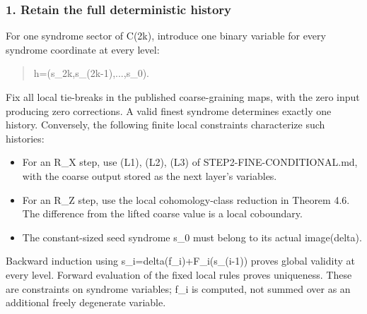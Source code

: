 \documentclass[
]{article}
\providecommand{\tightlist}{%
  \setlength{\itemsep}{0pt}\setlength{\parskip}{0pt}}
\begin{document}
\subsubsection{1. Retain the full deterministic
history}\label{retain-the-full-deterministic-history}

For one syndrome sector of C(2k), introduce one binary variable for
every syndrome coordinate at every level:

\begin{quote}\small\ttfamily\raggedright\setlength{\parskip}{0pt}
\noindent h\allowbreak{}\hspace*{0.525em}\allowbreak{}=\allowbreak{}\hspace*{0.525em}\allowbreak{}(\allowbreak{}s\allowbreak{}\_\allowbreak{}2\allowbreak{}k\allowbreak{},\allowbreak{}\hspace*{0.525em}\allowbreak{}s\allowbreak{}\_\allowbreak{}(\allowbreak{}2\allowbreak{}k\allowbreak{}-\allowbreak{}1\allowbreak{})\allowbreak{},\allowbreak{}\hspace*{0.525em}\allowbreak{}.\allowbreak{}.\allowbreak{}.\allowbreak{},\allowbreak{}\hspace*{0.525em}\allowbreak{}s\allowbreak{}\_\allowbreak{}0\allowbreak{})\allowbreak{}.\par
\end{quote}

Fix all local tie-breaks in the published coarse-graining maps, with the
zero input producing zero corrections. A valid finest syndrome
determines exactly one history. Conversely, the following finite local
constraints characterize such histories:

\begin{itemize}
\tightlist
\item
  For an R\_X step, use (L1), (L2), (L3) of STEP2-FINE-CONDITIONAL.md,
  with the coarse output stored as the next layer's variables.
\item
  For an R\_Z step, use the local cohomology-class reduction in Theorem
  4.6. The difference from the lifted coarse value is a local
  coboundary.
\item
  The constant-sized seed syndrome s\_0 must belong to its actual
  image(delta).
\end{itemize}

Backward induction using
s\allowbreak{}\_\allowbreak{}i\allowbreak{}=\allowbreak{}d\allowbreak{}e\allowbreak{}l\allowbreak{}t\allowbreak{}a\allowbreak{}(\allowbreak{}f\allowbreak{}\_\allowbreak{}i\allowbreak{})\allowbreak{}+\allowbreak{}F\allowbreak{}\_\allowbreak{}i\allowbreak{}(\allowbreak{}s\allowbreak{}\_\allowbreak{}(\allowbreak{}i\allowbreak{}-\allowbreak{}1\allowbreak{})\allowbreak{})
proves global validity at every level. Forward evaluation of the fixed
local rules proves uniqueness. These are constraints on syndrome
variables; f\_i is computed, not summed over as an additional freely
degenerate variable.
\end{document}
